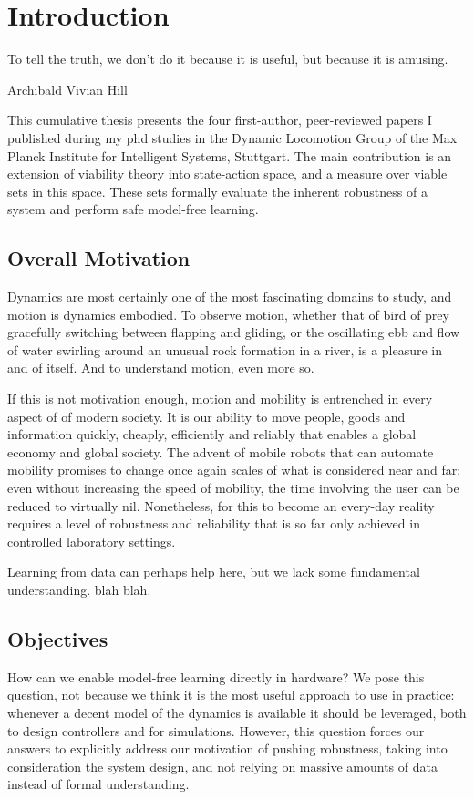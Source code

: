 
\chapter{Introduction}
\epigraph{To tell the truth, we don't do it because it is useful, but because it is amusing.}{Archibald Vivian Hill}

This cumulative thesis presents the four first-author, peer-reviewed papers I published during my phd studies in the Dynamic Locomotion Group of the Max Planck Institute for Intelligent Systems, Stuttgart. The main contribution is an extension of viability theory into state-action space, and a measure over viable sets in this space. These sets formally evaluate the inherent robustness of a system and perform safe model-free learning.

\section{Overall Motivation}

Dynamics are most certainly one of the most fascinating domains to study, and motion is dynamics embodied. To observe motion, whether that of bird of prey gracefully switching between flapping and gliding, or the oscillating ebb and flow of water swirling around an unusual rock formation in a river, is a pleasure in and of itself. And to understand motion, even more so. \par
If this is not motivation enough, motion and mobility is entrenched in every aspect of of modern society. It is our ability to move people, goods and information quickly, cheaply, efficiently and reliably that enables a global economy and global society. The advent of mobile robots that can automate mobility promises to change once again scales of what is considered near and far: even without increasing the speed of mobility, the time involving the user can be reduced to virtually nil. Nonetheless, for this to become an every-day reality requires a level of robustness and reliability that is so far only achieved in controlled laboratory settings. \par
Learning from data can perhaps help here, but we lack some fundamental understanding. blah blah.

\section{Objectives}
How can we enable model-free learning directly in hardware?
We pose this question, not because we think it is the most useful approach to use in practice: whenever a decent model of the dynamics is available it should be leveraged, both to design controllers and for simulations. However, this question forces our answers to explicitly address our motivation of pushing robustness, taking into consideration the system design, and not relying on massive amounts of data instead of formal understanding.

